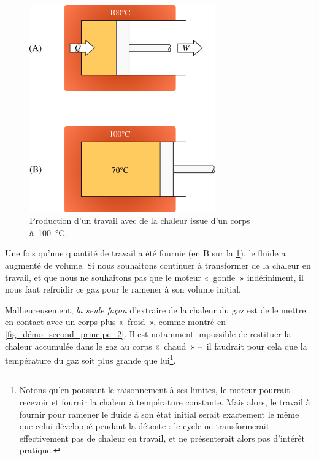 		\begin{figure}
			\begin{center}
				\includegraphics[width=8cm]{images/demo_second_principe_1.png}
			\end{center}
			\caption{Production d’un travail avec de la chaleur issue d’un corps à~\SI{100}{\degreeCelsius}.}
			\label{fig_démo_second_principe_1}
		\end{figure}

		Une fois qu’une quantité de travail a été fournie (en B sur la \cref{fig_démo_second_principe_1}), le fluide a augmenté de volume. Si nous souhaitons continuer à transformer de la chaleur en travail, et que nous ne souhaitons pas que le moteur «~gonfle~» indéfiniment, il nous faut refroidir ce gaz pour le ramener à son volume initial.

		Malheureusement, \emph{la seule façon} d’extraire de la chaleur du gaz est de le mettre en contact avec un corps plus «~froid~», comme montré en \cref{fig_démo_second_principe_2}. Il est notamment impossible de restituer la chaleur accumulée dans le gaz au corps «~chaud~» --\ il faudrait pour cela que la température du gaz soit plus grande que lui\footnote{Notons qu’en poussant le raisonnement à ses limites, le moteur pourrait recevoir et fournir la chaleur à température constante. Mais alors, le travail à fournir pour ramener le fluide à son état initial serait exactement le même que celui développé pendant la détente : le cycle ne transformerait effectivement pas de chaleur en travail, et ne présenterait alors pas d’intérêt pratique.}\nolinebreak.

